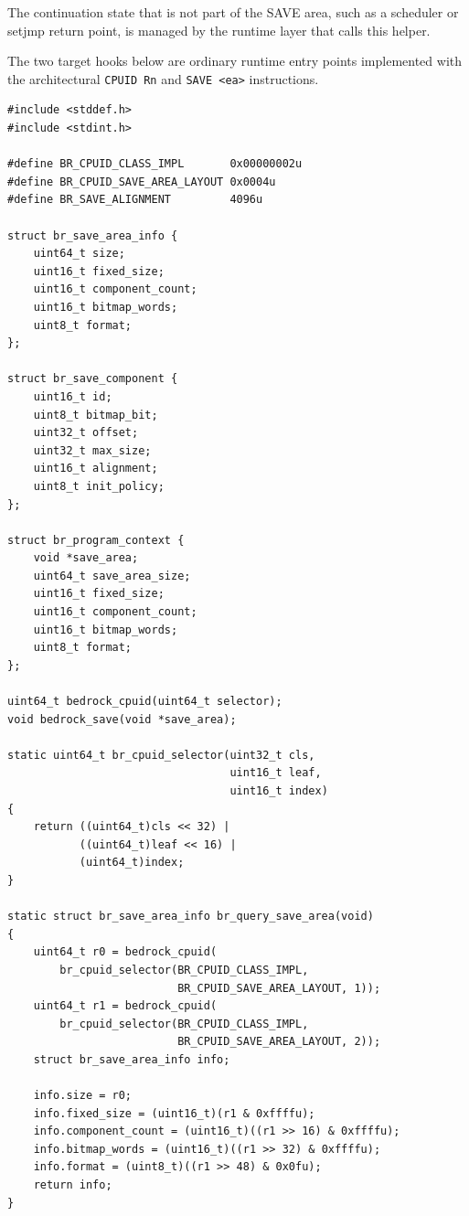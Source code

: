 The continuation state that is not part of the SAVE area, such as a scheduler or setjmp return point, is managed
by the runtime layer that calls this helper.

The two target hooks below are ordinary runtime entry points implemented with the architectural \texttt{CPUID Rn}
and \texttt{SAVE \textless{}ea\textgreater{}} instructions.

\par\begingroup\footnotesize
\begin{verbatim}
#include <stddef.h>
#include <stdint.h>

#define BR_CPUID_CLASS_IMPL       0x00000002u
#define BR_CPUID_SAVE_AREA_LAYOUT 0x0004u
#define BR_SAVE_ALIGNMENT         4096u

struct br_save_area_info {
    uint64_t size;
    uint16_t fixed_size;
    uint16_t component_count;
    uint16_t bitmap_words;
    uint8_t format;
};

struct br_save_component {
    uint16_t id;
    uint8_t bitmap_bit;
    uint32_t offset;
    uint32_t max_size;
    uint16_t alignment;
    uint8_t init_policy;
};

struct br_program_context {
    void *save_area;
    uint64_t save_area_size;
    uint16_t fixed_size;
    uint16_t component_count;
    uint16_t bitmap_words;
    uint8_t format;
};

uint64_t bedrock_cpuid(uint64_t selector);
void bedrock_save(void *save_area);

static uint64_t br_cpuid_selector(uint32_t cls,
                                  uint16_t leaf,
                                  uint16_t index)
{
    return ((uint64_t)cls << 32) |
           ((uint64_t)leaf << 16) |
           (uint64_t)index;
}

static struct br_save_area_info br_query_save_area(void)
{
    uint64_t r0 = bedrock_cpuid(
        br_cpuid_selector(BR_CPUID_CLASS_IMPL,
                          BR_CPUID_SAVE_AREA_LAYOUT, 1));
    uint64_t r1 = bedrock_cpuid(
        br_cpuid_selector(BR_CPUID_CLASS_IMPL,
                          BR_CPUID_SAVE_AREA_LAYOUT, 2));
    struct br_save_area_info info;

    info.size = r0;
    info.fixed_size = (uint16_t)(r1 & 0xffffu);
    info.component_count = (uint16_t)((r1 >> 16) & 0xffffu);
    info.bitmap_words = (uint16_t)((r1 >> 32) & 0xffffu);
    info.format = (uint8_t)((r1 >> 48) & 0x0fu);
    return info;
}


\end{verbatim}
